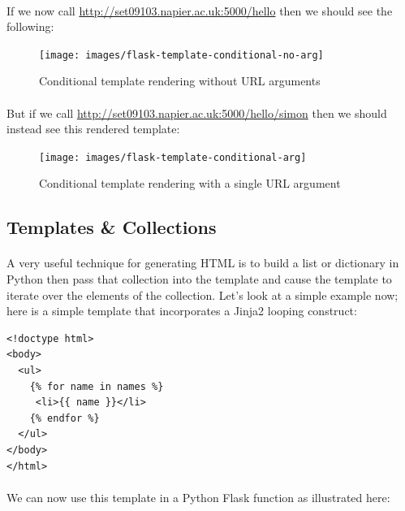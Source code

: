 \documentclass[12pt, a4paper, oneside]{book}
\begin{document}
{\paragraph{} If we now call \url{http://set09103.napier.ac.uk:5000/hello} then we should see the following:

\begin{figure}[H]
\centering
\texttt{[image: images/flask-template-conditional-no-arg]}
\caption{Conditional template rendering without URL arguments}
\label{fig:flask-template-conditional-no-arg}
\end{figure}

\paragraph{} But if we call \url{http://set09103.napier.ac.uk:5000/hello/simon} then we should instead see this rendered template:

\begin{figure}[H]
\centering
\texttt{[image: images/flask-template-conditional-arg]}
\caption{Conditional template rendering with a single URL argument}
\label{fig:flask-template-conditional-arg}
\end{figure}


\subsection{Templates \& Collections}
\label{templates-collections}
\paragraph{} A very useful technique for generating HTML is to build a list or dictionary in Python then pass that collection into the template and cause the template to iterate over the elements of the collection. Let's look at a simple example now; here is a simple template that incorporates a Jinja2 looping construct:

\begin{lstlisting}
<!doctype html>
<body>
  <ul>
    {% for name in names %}
     <li>{{ name }}</li>
    {% endfor %}
  </ul>
</body>
</html>
\end{lstlisting}

\paragraph{} We can now use this template in a Python Flask function as illustrated here:

}
\end{document}

